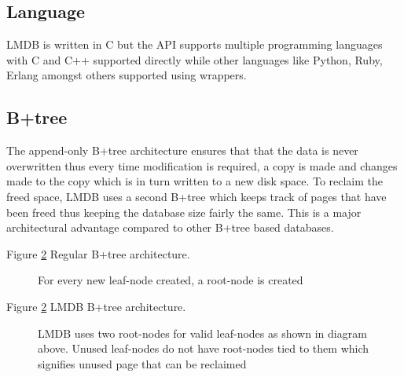 \documentclass[9pt,twocolumn,twoside]{../../styles/osajnl}
\begin{document}
\subsection{Language}

LMDB is written in C but the API supports multiple programming
languages with C and C++ supported directly while other languages like
Python, Ruby, Erlang amongst others supported using
wrappers\cite{www-lmdbwrap}.

\subsection{B+tree}

The append-only B+tree architecture ensures that that the data is
never overwritten thus every time modification is required, a copy is
made and changes made to the copy which is in turn written to a new
disk space. To reclaim the freed space, LMDB uses a second B+tree
which keeps track of pages that have been freed thus keeping the
database size fairly the same. This is a major architectural advantage
compared to other B+tree based databases.

Figure \ref{fig:false-color} Regular B+tree architecture.

\begin{figure}[htbp]
\centering
{}
\caption{For every new leaf-node created, a root-node is created}
\label{fig:false-color}
\end{figure}

Figure \ref{fig:false-color} LMDB B+tree architecture.

\begin{figure}[htbp]
\centering
{}
\caption{LMDB uses two root-nodes for valid leaf-nodes as shown in
  diagram above. Unused leaf-nodes do not have root-nodes tied to them
  which signifies unused page that can be reclaimed}
\label{fig:false-color}
\end{figure}
\end{document}
